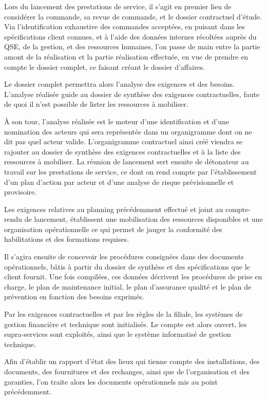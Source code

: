 Lors du lancement des prestations de service, il s’agit en premier lieu de considérer la commande, sa revue de commande, et le dossier contractuel d’étude. Via l’identification exhaustive des commandes acceptées, en puisant dans les spécifications client connues, et à l’aide des données internes récoltées auprès du QSE, de la gestion, et des ressources humaines, l’on passe de main entre la partie amont de la réalisation et la partie réalisation effectuée, en vue de prendre en compte le dossier complet, ce faisant créant le dossier d’affaires.

Le dossier complet permettra alors l’analyse des exigences et des besoins. L’analyse réalisée guide au dossier de synthèse des exigences contractuelles, faute de quoi il n’est possible de lister les ressources à mobiliser.

À son tour, l’analyse réalisée est le moteur d’une identification et d’une nomination des acteurs qui sera représentée dans un organigramme dont on ne dit pas quel acteur valide. L’organigramme contractuel ainsi créé viendra se rajouter au dossier de synthèse des exigences contractuelles et à la liste des ressources à mobiliser. La réunion de lancement sert ensuite de détonateur au travail sur les prestations de service, ce dont on rend compte par l’établissement d’un plan d’action par acteur et d’une analyse de risque prévisionnelle et provisoire.

Les exigences relatives au planning précédemment effectué et joint au compte-rendu de lancement, établissent une mobilisation des ressources disponibles et une organisation opérationnelle ce qui permet de  jauger la conformité des habilitations et  des formations requises.

Il s’agira ensuite de concevoir les procédures consignées dans des documents opérationnels, bâtis à partir du dossier de synthèse et des spécifications que le client fournit. Une fois compilées, ces données décrivent les procédures de prise en charge, le plan de maintenance initial, le plan d’assurance qualité et le plan de prévention en fonction des besoins exprimés.

Par les exigences contractuelles et par les règles de la filiale, les systèmes de gestion financière et technique sont initialisés. Le compte est alors ouvert, les supra-services sont exploités, ainsi que le système informatisé de gestion technique.

Afin d’établir un rapport d’état des lieux qui tienne compte des installations, des documents, des fournitures et des rechanges, ainsi que de l’organisation et des garanties, l’on traite alors les documents opérationnels mis au point précédemment.

